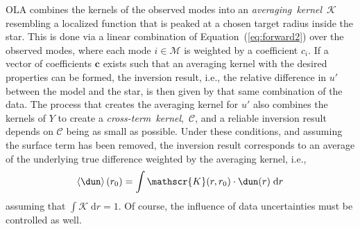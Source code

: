 OLA combines the kernels of the observed modes into an \emph{averaging~kernel}~$\mathscr{K}$ resembling a localized function that is peaked at a chosen target radius inside the star. 
This is done via a linear combination of Equation~(\ref{eq:forward2}) over the observed modes, where each mode ${i \in \mathscr{M}}$ is weighted by a coefficient $c_i$. 
If a vector of coefficients $\mathbf c$ exists such that an averaging kernel with the desired properties can be formed, the inversion result, i.e., the relative difference in $u'$ between the model and the star, is then given by that same combination of the data. 
The process that creates the averaging kernel for $u'$ also combines the kernels of $Y$ to create a \emph{cross-term~kernel},~$\mathscr{C}$, and a reliable inversion result depends on $\mathscr{C}$ being as small as possible. 
Under these conditions, and assuming the surface term has been removed, the inversion result corresponds to an average of the underlying true difference weighted by the averaging kernel, i.e.,
\begin{equation}
    \left\langle\dun\right\rangle(r_0)
    =
    \int{\mathscr{K}}(r,r_0)\cdot \dun(r) \; \text{d}r
\end{equation}
assuming that ${\int{\mathscr{K}}\;\text{d}r=1}$.
Of course, the influence of data uncertainties must  be controlled as well.


